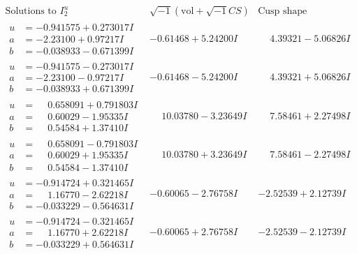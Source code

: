\documentclass[1p]{elsarticle_modified}
\theoremstyle{definition}
\newcommand{\I}{\sqrt{-1}}
\begin{document}
$$\begin{array}{c|c|c}  
\text{Solutions to }I^u_{2}& \I (\text{vol} + \sqrt{-1}CS) & \text{Cusp shape}\\
 \hline 
\begin{aligned}
u &= -0.941575 + 0.273017 I \\
a &= -2.23100 + 0.97217 I \\
b &= -0.038933 - 0.671399 I\end{aligned}
 & -0.61468 + 5.24200 I & \phantom{-}4.39321 - 5.06826 I \\ \hline\begin{aligned}
u &= -0.941575 - 0.273017 I \\
a &= -2.23100 - 0.97217 I \\
b &= -0.038933 + 0.671399 I\end{aligned}
 & -0.61468 - 5.24200 I & \phantom{-}4.39321 + 5.06826 I \\ \hline\begin{aligned}
u &= \phantom{-}0.658091 + 0.791803 I \\
a &= \phantom{-}0.60029 - 1.95335 I \\
b &= \phantom{-}0.54584 + 1.37410 I\end{aligned}
 & \phantom{-}10.03780 - 3.23649 I & \phantom{-}7.58461 + 2.27498 I \\ \hline\begin{aligned}
u &= \phantom{-}0.658091 - 0.791803 I \\
a &= \phantom{-}0.60029 + 1.95335 I \\
b &= \phantom{-}0.54584 - 1.37410 I\end{aligned}
 & \phantom{-}10.03780 + 3.23649 I & \phantom{-}7.58461 - 2.27498 I \\ \hline\begin{aligned}
u &= -0.914724 + 0.321465 I \\
a &= \phantom{-}1.16770 - 2.62218 I \\
b &= -0.033229 - 0.564631 I\end{aligned}
 & -0.60065 - 2.76758 I & -2.52539 + 2.12739 I \\ \hline\begin{aligned}
u &= -0.914724 - 0.321465 I \\
a &= \phantom{-}1.16770 + 2.62218 I \\
b &= -0.033229 + 0.564631 I\end{aligned}
 & -0.60065 + 2.76758 I & -2.52539 - 2.12739 I \\ \hline\begin{aligned}

\end{aligned}
\end{array}$$
\end{document}

